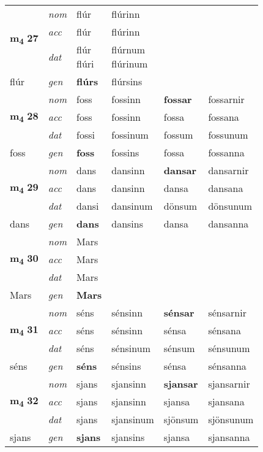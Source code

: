 \begin{longtable}[l]{X>{\footnotesize\itshape}XXXXX}
\multirow{3}{*}{{{\textbf{m{\textsubscript{4}}} \Large{\textbf{27}}}}} & nom & flúr & flúrinn & \textbf{} &  \\*
 & acc & flúr & flúrinn &  &  \\*
 & dat & \specialcell{flúr\\ flúri} & \specialcell{flúrnum\\ flúrinum} &  &  \\*
 {\footnotesize{flúr}} & gen & \textbf{flúrs} & flúrsins &  &  \\
\cmidrule{1-6}

\multirow{3}{*}{{{\textbf{m{\textsubscript{4}}} \Large{\textbf{28}}}}} & nom & foss & fossinn & \textbf{fossar} & fossarnir \\*
 & acc & foss & fossinn & fossa & fossana \\*
 & dat & fossi & fossinum & fossum & fossunum \\*
 {\footnotesize{foss}} & gen & \textbf{foss} & fossins & fossa & fossanna \\
\cmidrule{1-6}

\multirow{3}{*}{{{\textbf{m{\textsubscript{4}}} \Large{\textbf{29}}}}} & nom & dans & dansinn & \textbf{dansar} & dansarnir \\*
 & acc & dans & dansinn & dansa & dansana \\*
 & dat & dansi & dansinum & dönsum & dönsunum \\*
 {\footnotesize{dans}} & gen & \textbf{dans} & dansins & dansa & dansanna \\
\cmidrule{1-6}

\multirow{3}{*}{{{\textbf{m{\textsubscript{4}}} \Large{\textbf{30}}}}} & nom & Mars &  & \textbf{} &  \\*
 & acc & Mars &  &  &  \\*
 & dat & Mars &  &  &  \\*
 {\footnotesize{Mars}} & gen & \textbf{Mars} &  &  &  \\
\cmidrule{1-6}

\multirow{3}{*}{{{\textbf{m{\textsubscript{4}}} \Large{\textbf{31}}}}} & nom & séns & sénsinn & \textbf{sénsar} & sénsarnir \\*
 & acc & séns & sénsinn & sénsa & sénsana \\*
 & dat & séns & sénsinum & sénsum & sénsunum \\*
 {\footnotesize{séns}} & gen & \textbf{séns} & sénsins & sénsa & sénsanna \\
\cmidrule{1-6}

\multirow{3}{*}{{{\textbf{m{\textsubscript{4}}} \Large{\textbf{32}}}}} & nom & sjans & sjansinn & \textbf{sjansar} & sjansarnir \\*
 & acc & sjans & sjansinn & sjansa & sjansana \\*
 & dat & sjans & sjansinum & sjönsum & sjönsunum \\*
 {\footnotesize{sjans}} & gen & \textbf{sjans} & sjansins & sjansa & sjansanna \\
\cmidrule{1-6}


\end{longtable}
